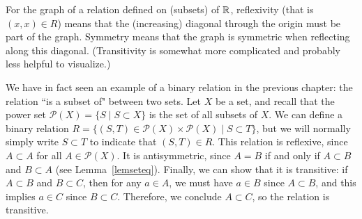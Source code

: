 For the graph of a relation defined on (subsets) of ${\mathbb R}$, reflexivity (that is $(x,x)\in
R$) means that the (increasing) diagonal through the origin must be part of the graph.
Symmetry means that the graph is symmetric when reflecting along this diagonal.
(Transitivity is somewhat more complicated and probably less helpful to visualize.)


We have in fact seen an example of a binary relation in the previous chapter: the relation ``is a subset of" between two sets.
Let $X$ be a set, and recall that the power set $\mathcal{P}(X) = \{S \mid S \subset X\}$ is the set of all subsets of $X$.
We can define a binary relation $R = \{ (S,T) \in \mathcal{P}(X) \times \mathcal{P}(X) \mid S \subset T \}$, but we will normally simply write $S \subset T$ to indicate that $(S,T) \in R$.
This relation is reflexive, since $A \subset A$ for all $A \in \mathcal{P}(X)$.
It is antisymmetric, since $A=B$ if and only if $A\subset B$ and $B \subset
A$ (see Lemma~\ref{lemseteq}).
Finally, we can show that it is transitive: if $A \subset B$ and $B \subset C$, then for any $a \in A$, we must have $a \in B$ since $A \subset B$, and this implies $a \in C$ since $B \subset C$.  Therefore, we conclude $A \subset C$, so the relation is transitive.




